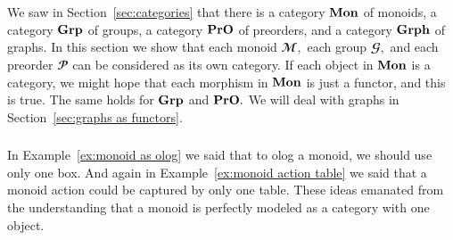 \documentclass[../main/CT4S-EN-RU]{subfiles}
\begin{document}
\section{}


\subsection{}\label{sec:mon grp pro as cat}

\begin{blockENG}
We saw in Section~\ref{sec:categories} that there is a category ${\mathbf{Mon}}$ of monoids, a category ${\mathbf{Grp}}$ of groups, a category ${\mathbf{PrO}}$ of preorders, and a category ${\mathbf{Grph}}$ of graphs. In this section we show that each monoid ${𝓜},$ each group ${𝓖},$ and each preorder ${𝓟}$ can be considered as its own category. If each object in ${\mathbf{Mon}}$ is a category, we might hope that each morphism in ${\mathbf{Mon}}$ is just a functor, and this is true. The same holds for ${\mathbf{Grp}}$ and ${\mathbf{PrO}}.$ We will deal with graphs in Section~\ref{sec:graphs as functors}.
\end{blockENG}

\begin{blockRUS}
\end{blockRUS}


\subsubsection{}\label{sec:monoids as cats}

\begin{blockENG}
In Example~\ref{ex:monoid as olog} we said that to olog a monoid, we should use only one box. And again in Example~\ref{ex:monoid action table} we said that a monoid action could be captured by only one table. These ideas emanated from the understanding that a monoid is perfectly modeled as a category with one object. 
\end{blockENG}

\begin{blockRUS}
\end{blockRUS}

\paragraph{} ~\\
\end{document}
